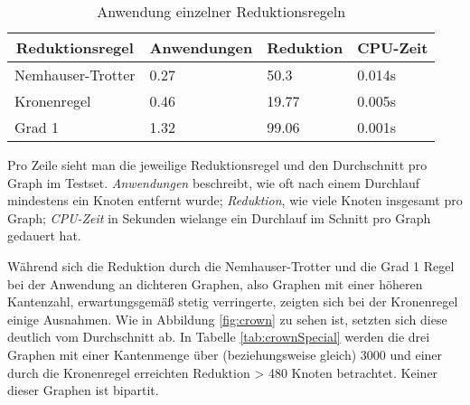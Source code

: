 \begin{table}[htb]
\caption{Anwendung einzelner Reduktionsregeln\label{tab:anwendung}}
\vspace*{1em}
\centering

\bgroup
\def\arraystretch{1.3}%

\begin{threeparttable}

\begin{tabular}[c]{llll}
	\hline
	\multicolumn{1}{c}{\textbf{Reduktionsregel}} & 
	\multicolumn{1}{c}{\textbf{Anwendungen}} & 
	\multicolumn{1}{c}{\textbf{Reduktion}} & 
	\multicolumn{1}{c}{\textbf{CPU-Zeit }} \\ 
	
	\hline

	Nemhauser-Trotter& 0.27 &  50.3 & 0.014s\\
	Kronenregel& 0.46 & 19.77 & 0.005s\\
	Grad 1&1.32 & 99.06 & 0.001s\\
	\hline
\end{tabular}

\begin{tablenotes}\footnotesize
\item Pro Zeile sieht man die jeweilige Reduktionsregel und den Durchschnitt pro Graph im Testset. \emph{Anwendungen} beschreibt, wie oft nach einem Durchlauf mindestens ein Knoten entfernt wurde; \emph{Reduktion}, wie viele Knoten insgesamt pro Graph; \emph{CPU-Zeit} in Sekunden wielange ein Durchlauf im Schnitt pro Graph gedauert hat.
\end{tablenotes}

\end{threeparttable}

\egroup

\end{table}
Während sich die Reduktion durch die Nemhauser-Trotter und die Grad 1 Regel bei der Anwendung an dichteren Graphen, also Graphen mit einer höheren Kantenzahl, erwartungsgemäß stetig verringerte, zeigten sich bei der Kronenregel einige Ausnahmen. Wie in Abbildung \ref{fig:crown} zu sehen ist, setzten sich diese deutlich vom Durchschnitt ab. In Tabelle \ref{tab:crownSpecial} werden die drei Graphen mit einer Kantenmenge über (beziehungsweise gleich) 3000 und einer durch die Kronenregel erreichten Reduktion > 480 Knoten betrachtet. Keiner dieser Graphen ist bipartit.
